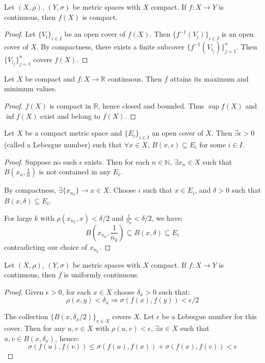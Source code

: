 \documentclass{functionspaces}
\begin{document}
\begin{proposition}
Let $(X,\rho)$, $(Y,\sigma)$ be metric spaces with $X$ compact. If $f:X \to Y$ is continuous, then $f(X)$ is compact.
\end{proposition}

\begin{proof}
Let $\{V_i\}_{i\in I}$ be an open cover of $f(X)$. Then $\{f^{-1}(V_i)\}_{i\in I}$ is an open cover of $X$. By compactness, there exists a finite subcover $\{f^{-1}(V_{i_j})\}_{j=1}^n$. Then $\{V_{i_j}\}_{j=1}^n$ covers $f(X)$.
\end{proof}

\begin{proposition}
Let $X$ be compact and $f:X \to \mathbb{R}$ continuous. Then $f$ attains its maximum and minimum values.
\end{proposition}

\begin{proof}
$f(X)$ is compact in $\mathbb{R}$, hence closed and bounded. Thus $\sup f(X)$ and $\inf f(X)$ exist and belong to $f(X)$.
\end{proof}

\begin{lemma}
Let $X$ be a compact metric space and $\{E_i\}_{i\in I}$ an open cover of $X$. Then $\exists \epsilon > 0$ (called a Lebesgue number) such that $\forall x \in X$, $B(x,\epsilon) \subseteq E_i$ for some $i \in I$.
\end{lemma}

\begin{proof}
Suppose no such $\epsilon$ exists. Then for each $n \in \mathbb{N}$, $\exists x_n \in X$ such that $B(x_n,\frac{1}{n})$ is not contained in any $E_i$. 

By compactness, $\exists \{x_{n_k}\} \to x \in X$. Choose $i$ such that $x \in E_i$, and $\delta > 0$ such that $B(x,\delta) \subseteq E_i$. 

For large $k$ with $\rho(x_{n_k},x) < \delta/2$ and $\frac{1}{n_k} < \delta/2$, we have:
\[ B\left(x_{n_k},\frac{1}{n_k}\right) \subseteq B(x,\delta) \subseteq E_i \]
contradicting our choice of $x_{n_k}$.
\end{proof}

\begin{proposition}
Let $(X,\rho)$, $(Y,\sigma)$ be metric spaces with $X$ compact. If $f:X \to Y$ is continuous, then $f$ is uniformly continuous.
\end{proposition}

\begin{proof}
Given $\epsilon > 0$, for each $x \in X$ choose $\delta_x > 0$ such that:
\[ \rho(x,y) < \delta_x \Rightarrow \sigma(f(x),f(y)) < \epsilon/2 \]

The collection $\{B(x,\delta_x/2)\}_{x\in X}$ covers $X$. Let $\epsilon$ be a Lebesgue number for this cover. Then for any $u,v \in X$ with $\rho(u,v) < \epsilon$, $\exists x \in X$ such that $u,v \in B(x,\delta_x)$, hence:
\[ \sigma(f(u),f(v)) \leq \sigma(f(u),f(x)) + \sigma(f(x),f(v)) < \epsilon \]
\end{proof}
\end{document}
